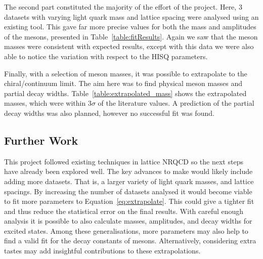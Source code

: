 \documentclass[a4paper,12pt]{article}
\begin{document}
The second part constituted the majority of the effort of the project. Here, 3 datasets with varying light quark mass and lattice spacing were analysed using an existing tool. This gave far more precise values for both the mass and amplitudes of the mesons, presented in Table~\ref{table:fitResults}. Again we saw that the meson masses were consistent with expected results, except with this data we were also able to notice the variation with respect to the HISQ parameters.

Finally, with a selection of meson masses, it was possible to extrapolate to the chiral/continuum limit. The aim here was to find physical meson masses and partial decay widths. Table~\ref{table:extrapolated_mass} shows the extrapolated masses, which were within $3\sigma$ of the literature values. A prediction of the partial decay widths was also planned, however no successful fit was found.

\subsection{Further Work}
This project followed existing techniques in lattice NRQCD so the next steps have already been explored well. The key advances to make would likely include adding more datasets. That is, a larger variety of light quark masses, and lattice spacings. By increasing the number of datasets analysed it would become viable to fit more parameters to Equation~\ref{eq:extrapolate}. This could give a tighter fit and thus reduce the statistical error on the final results. With careful enough analysis it is possible to also calculate masses, amplitudes, and decay widths for excited states. Among these generalisations, more parameters may also help to find a valid fit for the decay constants of mesons. Alternatively, considering extra tastes may add insightful contributions to these extrapolations.

\printbibliography{}
\end{document}
